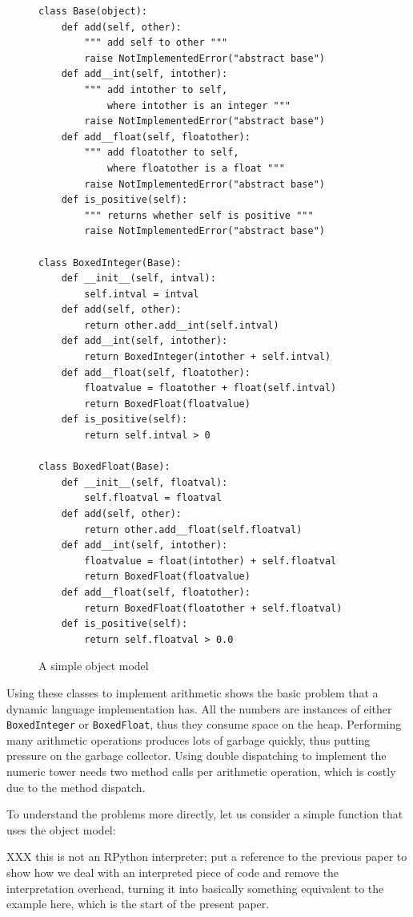 \documentclass{sigplanconf}
\begin{document}
\begin{figure}
\begin{verbatim}
class Base(object):
    def add(self, other):
        """ add self to other """
        raise NotImplementedError("abstract base")
    def add__int(self, intother):
        """ add intother to self,
            where intother is an integer """
        raise NotImplementedError("abstract base")
    def add__float(self, floatother):
        """ add floatother to self,
            where floatother is a float """
        raise NotImplementedError("abstract base")
    def is_positive(self):
        """ returns whether self is positive """
        raise NotImplementedError("abstract base")

class BoxedInteger(Base):
    def __init__(self, intval):
        self.intval = intval
    def add(self, other):
        return other.add__int(self.intval)
    def add__int(self, intother):
        return BoxedInteger(intother + self.intval)
    def add__float(self, floatother):
        floatvalue = floatother + float(self.intval)
        return BoxedFloat(floatvalue)
    def is_positive(self):
        return self.intval > 0

class BoxedFloat(Base):
    def __init__(self, floatval):
        self.floatval = floatval
    def add(self, other):
        return other.add__float(self.floatval)
    def add__int(self, intother):
        floatvalue = float(intother) + self.floatval
        return BoxedFloat(floatvalue)
    def add__float(self, floatother):
        return BoxedFloat(floatother + self.floatval)
    def is_positive(self):
        return self.floatval > 0.0
\end{verbatim}
\caption{A simple object model}
\label{fig:objmodel}
\end{figure}

Using these classes to implement arithmetic shows the basic problem that a
dynamic language implementation has. All the numbers are instances of either
\texttt{BoxedInteger} or \texttt{BoxedFloat}, thus they consume space on the
heap. Performing many arithmetic operations produces lots of garbage quickly,
thus putting pressure on the garbage collector. Using double dispatching to
implement the numeric tower needs two method calls per arithmetic operation,
which is costly due to the method dispatch.

To understand the problems more directly, let us consider a simple function
that uses the object model:

XXX this is not an RPython interpreter; put a reference to the previous
paper to show how we deal with an interpreted piece of code and remove
the interpretation overhead, turning it into basically something
equivalent to the example here, which is the start of the present paper.
\end{document}
